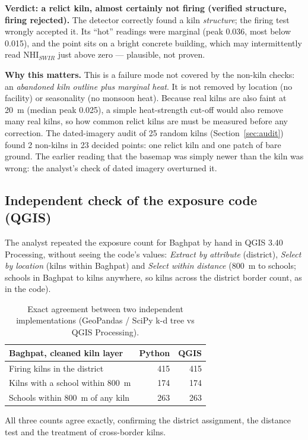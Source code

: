 \documentclass[11pt,a4paper]{article}
\begin{document}
\textbf{Verdict: a relict kiln, almost certainly not firing (verified
structure, firing rejected).} The detector correctly found a kiln
\emph{structure}; the firing test wrongly accepted it. Its ``hot'' readings were
marginal (peak 0.036, most below 0.015), and the point sits on a bright concrete
building, which may intermittently read NHI$_{SWIR}$ just above zero ---
plausible, not proven.

\textbf{Why this matters.} This is a failure mode not covered by the non-kiln
checks: an \emph{abandoned kiln outline plus marginal heat}. It is not removed by
location (no facility) or seasonality (no monsoon heat). Because real kilns are
also faint at 20~m (median peak 0.025), a simple heat-strength cut-off would
also remove many real kilns, so how common relict kilns are must be measured
before any correction. The dated-imagery audit of 25 random kilns
(Section~\ref{sec:audit}) found 2 non-kilns in 23 decided points: one relict
kiln and one patch of bare ground.
The earlier reading that the basemap was simply newer than the kiln was wrong:
the analyst's check of dated imagery overturned it.

\subsection{Independent check of the exposure code (QGIS)}
The analyst repeated the exposure count for Baghpat by hand in QGIS 3.40
Processing, without seeing the code's values: \emph{Extract by attribute}
(district), \emph{Select by location} (kilns within Baghpat) and \emph{Select
within distance} (800~m to schools; schools in Baghpat to kilns anywhere, so
kilns across the district border count, as in the code).

\begin{table}[H]
\centering\small
\begin{tabular}{@{}lrr@{}}
\toprule
Baghpat, cleaned kiln layer & Python & QGIS \\
\midrule
Firing kilns in the district              & 415 & 415 \\
Kilns with a school within 800~m          & 174 & 174 \\
Schools within 800~m of any kiln          & 263 & 263 \\
\bottomrule
\end{tabular}
\caption{Exact agreement between two independent implementations (GeoPandas /
SciPy k-d tree vs QGIS Processing).}
\end{table}
All three counts agree exactly, confirming the district assignment, the
distance test and the treatment of cross-border kilns.
\end{document}

